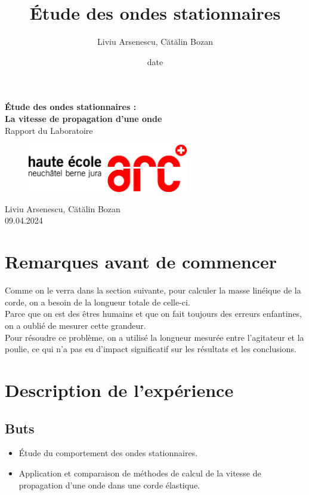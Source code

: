 \documentclass[12pt,a4paper]{article}
\title{Étude des ondes stationnaires}
\author{Liviu Arsenescu, Cătălin Bozan}
\date{date}
\begin{document}
    \begin{titlepage}
        \begin{center}
            \vspace*{\fill}
            \Huge \textbf{Étude des ondes stationnaires :} \\
            \Huge \textbf{La vitesse de propagation d'une onde} \\
            \Large Rapport du Laboratoire \\
            \begin{figure}[h]
                \centering
                \includegraphics[width=7cm]{hearclogo.png}
            \end{figure}
            \vspace{\fill}
            \Large Liviu Arsenescu, Cătălin Bozan \\
            09.04.2024

            \vspace*{\fill}
        \end{center}
    \end{titlepage}

    \thispagestyle{empty}
    \tableofcontents
    \newpage

    \section{Remarques avant de commencer}
    Comme on le verra dans la section suivante, pour calculer la masse linéique de la corde, on a besoin de la longueur totale de celle-ci. \\
    Parce que on est des êtres humains et que on fait toujours des erreurs enfantines, on a oublié de mesurer cette grandeur. \\
    Pour résoudre ce problème, on a utilisé la longueur mesurée entre l'agitateur et la poulie, ce qui n'a pas eu d'impact significatif sur les résultats et les conclusions.
    \section{Description de l'expérience}
    \subsection{Buts}
    \begin{itemize}
        \item Étude du comportement des ondes stationnaires.
        \item Application et comparaison de méthodes de calcul de la vitesse de propagation d'une onde dans une corde élastique.
    \end{itemize}
\end{document}
